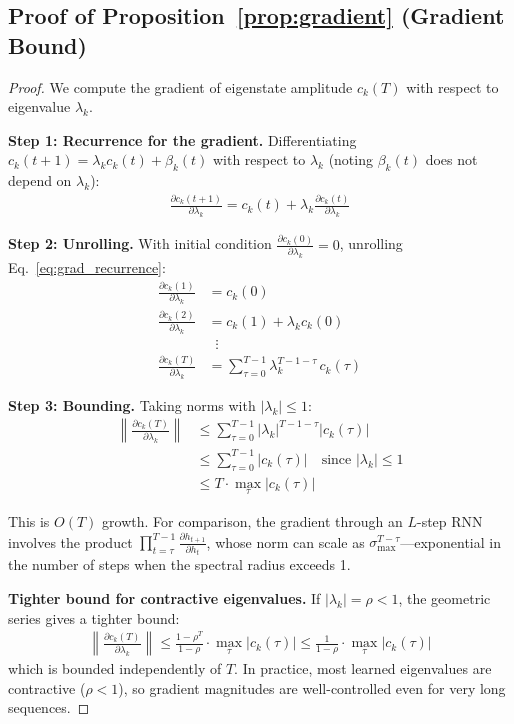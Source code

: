 \documentclass{article}
\begin{document}
\subsection{Proof of Proposition~\ref{prop:gradient} (Gradient Bound)}

\begin{proof}
We compute the gradient of eigenstate amplitude $c_k(T)$ with respect to eigenvalue $\lambda_k$.

\textbf{Step 1: Recurrence for the gradient.}
Differentiating $c_k(t+1) = \lambda_k c_k(t) + \beta_k(t)$ with respect to $\lambda_k$ (noting $\beta_k(t)$ does not depend on $\lambda_k$):
\begin{align}
\frac{\partial c_k(t+1)}{\partial \lambda_k} = c_k(t) + \lambda_k \frac{\partial c_k(t)}{\partial \lambda_k} \label{eq:grad_recurrence}
\end{align}

\textbf{Step 2: Unrolling.}
With initial condition $\frac{\partial c_k(0)}{\partial \lambda_k} = 0$, unrolling Eq.~\ref{eq:grad_recurrence}:
\begin{align}
\frac{\partial c_k(1)}{\partial \lambda_k} &= c_k(0) \\
\frac{\partial c_k(2)}{\partial \lambda_k} &= c_k(1) + \lambda_k c_k(0) \\
&\;\;\vdots \nonumber \\
\frac{\partial c_k(T)}{\partial \lambda_k} &= \sum_{\tau=0}^{T-1} \lambda_k^{T-1-\tau} \, c_k(\tau)
\end{align}

\textbf{Step 3: Bounding.}
Taking norms with $|\lambda_k| \leq 1$:
\begin{align}
\left\| \frac{\partial c_k(T)}{\partial \lambda_k} \right\| &\leq \sum_{\tau=0}^{T-1} |\lambda_k|^{T-1-\tau} |c_k(\tau)| \\
&\leq \sum_{\tau=0}^{T-1} |c_k(\tau)| \quad \text{since } |\lambda_k| \leq 1 \\
&\leq T \cdot \max_{\tau} |c_k(\tau)|
\end{align}

This is $O(T)$ growth. For comparison, the gradient through an $L$-step RNN involves the product $\prod_{t=\tau}^{T-1} \frac{\partial h_{t+1}}{\partial h_t}$, whose norm can scale as $\sigma_{\max}^{T-\tau}$---exponential in the number of steps when the spectral radius exceeds 1.

\textbf{Tighter bound for contractive eigenvalues.}
If $|\lambda_k| = \rho < 1$, the geometric series gives a tighter bound:
\begin{align}
\left\| \frac{\partial c_k(T)}{\partial \lambda_k} \right\| \leq \frac{1 - \rho^T}{1 - \rho} \cdot \max_\tau |c_k(\tau)| \leq \frac{1}{1-\rho} \cdot \max_\tau |c_k(\tau)|
\end{align}
which is bounded independently of $T$. In practice, most learned eigenvalues are contractive ($\rho < 1$), so gradient magnitudes are well-controlled even for very long sequences.
\end{proof}
\end{document}
